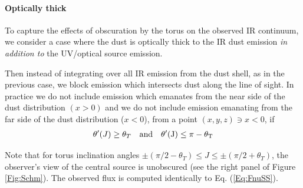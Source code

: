 \paragraph{Optically thick}
To capture the effects of obscuration by the torus on the observed IR
continuum, we consider a case where the dust is optically thick to the IR dust
emission \emph{in addition to} the UV/optical source emission.

Then instead of integrating over all IR emission from the dust shell, as in
the previous case, we block emission which intersects dust along the line of
sight. In practice we do not include emission which emanates from the near
side of the dust distribution $(x>0)$ and we do not include emission emanating
from the far side of the dust distribution ($x<0$), from a point $(x, y, z)
\ni x<0$, if
\begin{eqnarray}
\theta'(J) \geq \theta_T \quad \rm{and} \quad \theta'(J) \leq \pi - \theta_T
\end{eqnarray}

Note that for torus inclination angles $\pm(\pi/2 - \theta_T) \leq J \leq
\pm(\pi/2 + \theta_T)$, the observer's view of the central source is
unobscured (see the right panel of Figure \ref{Fig:Schm}). The observed flux
is computed identically to Eq. (\ref{Eq:FnuSS}).



